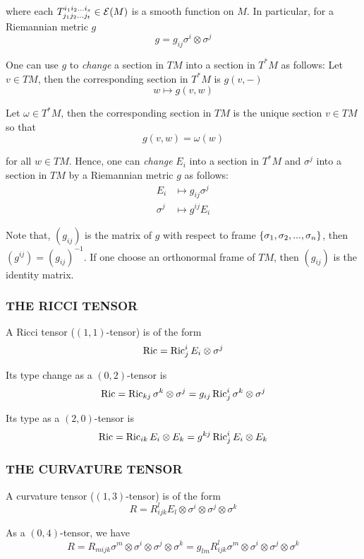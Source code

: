 where each $T_{j_1 j_2 ... j_t}^{i_1 i_2 ... i_s} \in \mathcal{E}(M)$ is a smooth function on $M$. In particular, for a Riemannian metric $g$
$$
	g = g_{ij} \sigma^i \otimes \sigma^j
$$

One can use $g$ to \textit{change} a section in $TM$ into a section in $T^*M$ as follows: Let $v \in TM$, then the corresponding section in $T^* M$ is $g(v, -)$
$$
	w \mapsto g(v, w)
$$

Let $\omega \in T^* M$, then the corresponding section in $TM$ is the unique section $v \in TM$ so that
$$
	g(v, w) = \omega(w)
$$

for all $w \in TM$. Hence, one can \textit{change} $E_i$ into a section in $T^* M$ and $\sigma^j$ into a section in $TM$ by a Riemannian metric $g$ as follows:
\begin{align*}
	E_i &\mapsto g_{ij} \sigma^j \\
	\sigma^j &\mapsto g^{ij} E_i
\end{align*}

Note that, $(g_{ij})$ is the matrix of $g$ with respect to frame $\{\sigma_1, \sigma_2, ..., \sigma_n\}$, then $(g^{ij}) = (g_{ij})^{-1}$. If one choose an orthonormal frame of $TM$, then $(g_{ij})$ is the identity matrix.

\subsubsection{THE RICCI TENSOR}

A Ricci tensor ($(1, 1)$-tensor) is of the form
$$
	\operatorname{Ric} = \operatorname{Ric}_j^i E_i \otimes \sigma^j
$$

Its type change as a $(0, 2)$-tensor is
$$
	\operatorname{Ric} = \operatorname{Ric}_{kj} \sigma^k \otimes \sigma^j = g_{ij} \operatorname{Ric}_j^i \sigma^k \otimes \sigma^j
$$

Its type as a $(2, 0)$-tensor is
$$
	\operatorname{Ric} = \operatorname{Ric}_{ik} E_i \otimes E_k = g^{kj} \operatorname{Ric}_j^i E_i \otimes E_k
$$

\subsubsection{THE CURVATURE TENSOR}

A curvature tensor ($(1, 3)$-tensor) is of the form
$$
	R = R_{ijk}^l E_l \otimes \sigma^i \otimes \sigma^j \otimes \sigma^k
$$

As a $(0, 4)$-tensor, we have
$$
	R = R_{mijk} \sigma^m \otimes \sigma^i \otimes \sigma^j \otimes \sigma^k = g_{lm} R_{ijk}^l \sigma^m \otimes \sigma^i \otimes \sigma^j \otimes \sigma^k
$$

